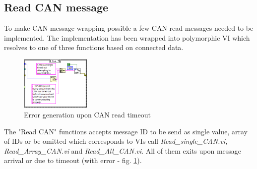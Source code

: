 \subsection{Read CAN message}
To make CAN message wrapping possible a few CAN read messages needed to be implemented. The implementation has been wrapped into polymorphic VI which resolves to one of three functions based on connected data.

\begin{figure}
    \centering
    \vspace{-20pt}
    \includegraphics[scale=\visc,max width=0.3\textwidth]{figures/Read_single_CANd2}
    \caption{Error generation upon CAN read timeout}
    \label{vi:CAN_timeout}
    \vspace{-60pt}
\end{figure}
The "Read CAN" functions accepts message ID to be send as single value, array of IDs or be omitted which corresponds to VIs call \textit{Read\_single\_CAN.vi}, \textit{Read\_Array\_CAN.vi} and \textit{Read\_All\_CAN.vi}.
All of them exits upon message arrival or due to timeout (with error - fig. \ref{vi:CAN_timeout}).

\vspace{2em}

